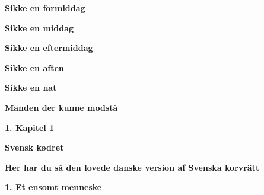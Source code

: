 \documentclass[]{article}
\begin{document}
\begin{center}
	\large\textbf{Sikke en formiddag}
\end{center}

\begin{center}
	\large\textbf{Sikke en middag}
\end{center}

\begin{center}
	\large\textbf{Sikke en eftermiddag}
\end{center}

\begin{center}
	\large\textbf{Sikke en aften}
\end{center}

\begin{center}
	\large\textbf{Sikke en nat}
\end{center}

\newpage

\begin{center}
	\Large\textbf{Manden der kunne modstå}
\end{center}

\begin{center}
	\large\textbf{1. Kapitel 1}
\end{center}

\newpage

\begin{center}
	\Large\textbf{Svensk kødret}
\end{center}

\begin{center}
	\large\textbf{Her har du så den lovede danske version af \newline Svenska korvrätt}
\end{center}

\begin{center}
	\large\textbf{1. Et ensomt menneske}
\end{center}
\end{document}
